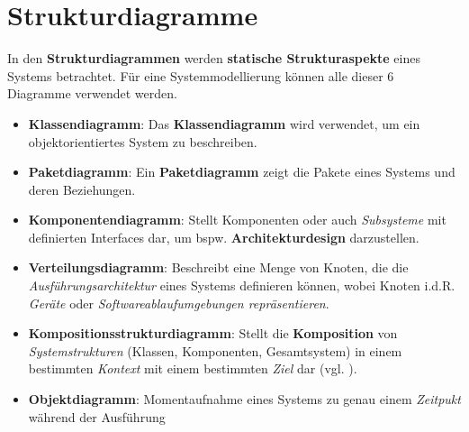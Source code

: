 \section{Strukturdiagramme}

\begin{tcolorbox}[title=Strukturdiagramme]
    In den \textbf{Strukturdiagrammen} werden \textbf{statische Strukturaspekte} eines Systems betrachtet.
    Für eine Systemmodellierung können alle dieser 6 Diagramme verwendet werden.

    \begin{itemize}
        \item \textbf{Klassendiagramm}: Das \textbf{Klassendiagramm} wird verwendet, um ein objektorientiertes System zu beschreiben.
        \item \textbf{Paketdiagramm}: Ein \textbf{Paketdiagramm} zeigt die Pakete eines Systems und deren Beziehungen.
        \item \textbf{Komponentendiagramm}: Stellt Komponenten oder auch \textit{Subsysteme} mit definierten Interfaces dar, um bspw. \textbf{Architekturdesign} darzustellen.
        \item \textbf{Verteilungsdiagramm}: Beschreibt eine Menge von Knoten, die die \textit{Ausführungsarchitektur} eines Systems definieren können, wobei Knoten i.d.R. \textit{Geräte} oder \textit{Softwareablaufumgebungen repräsentieren}.
        \item \textbf{Kompositionsstrukturdiagramm}: Stellt die \textbf{Komposition} von \textit{Systemstrukturen} (Klassen, Komponenten, Gesamtsystem) in einem bestimmten \textit{Kontext} mit einem bestimmten \textit{Ziel} dar (vgl. \cite[9]{Buh09}).
        \item \textbf{Objektdiagramm}: Momentaufnahme eines Systems zu genau einem \textit{Zeitpukt} während der Ausführung
    \end{itemize}

\end{tcolorbox}